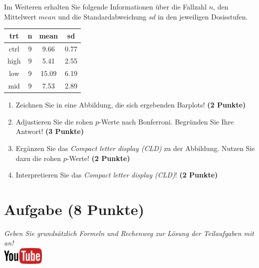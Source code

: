 \documentclass[a4paper, 9pt]{scrartcl}\usepackage[]{graphicx}\usepackage[]{xcolor}
\newenvironment{knitrout}{}{} %
\begin{document}
Im Weiteren erhalten Sie folgende Informationen {\"u}ber die Fallzahl $n$, den
Mittelwert $mean$ und die Standardabweichung $sd$ in den jeweiligen Dosisstufen.

\begin{knitrout}
\color{fgcolor}\begin{table}[!h]
\centering
\begin{tabular}{cccc}
\toprule
trt & n & mean & sd\\
\midrule
ctrl & 9 & 9.66 & 0.77\\
high & 9 & 5.41 & 2.55\\
low & 9 & 15.09 & 6.19\\
mid & 9 & 7.53 & 2.89\\
\bottomrule
\end{tabular}
\end{table}

\end{knitrout}


\begin{enumerate}
\item Zeichnen Sie in eine Abbildung, die sich ergebenden Barplots! \textbf{(2 Punkte)}
\item Adjustieren Sie die rohen $p$-Werte nach Bonferroni. Begr{\"u}nden Sie Ihre Antwort! \textbf{(3 Punkte)}
\item Erg{\"a}nzen Sie das \textit{Compact letter display (CLD)} zu der
  Abbildung. Nutzen Sie dazu die rohen $p$-Werte! \textbf{(2 Punkte)}
\item Interpretieren Sie das \textit{Compact letter display (CLD)}! \textbf{(2 Punkte)} 
\end{enumerate}

 
\clearpage

\section{Aufgabe \hfill (8 Punkte)}

\textit{Geben Sie grunds{\"a}tzlich Formeln und Rechenweg zur L{\"o}sung der
  Teilaufgaben mit an!} \\[1Ex]

 \hfill\href{https://youtu.be/xq29O8qDrg0}{\includegraphics[width =
   2cm]{img/youtube}}\\[1Ex]
\end{document}
